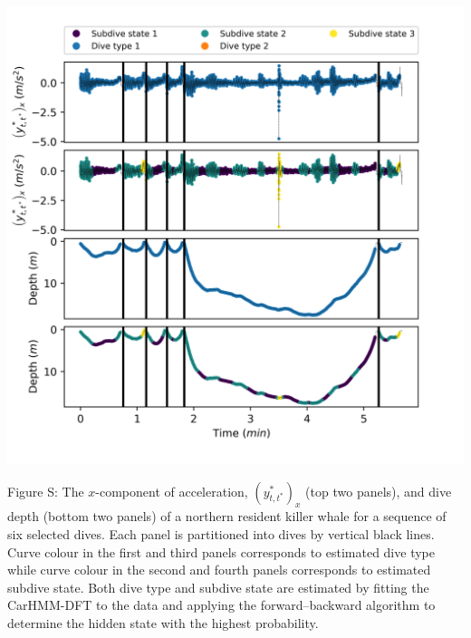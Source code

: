 \documentclass{article}
\begin{document}
        \begin{center}
        \includegraphics[width=6in]{../Plots/2019/20190902-182840-CATs_OB_1_0_267_CarHMM_decoded_dives.png}
        \end{center}
        
        \noindent Figure S: The $x$-component of acceleration, $(y^*_{t,t^*})_x$ (top two panels), and dive depth (bottom two panels) of a northern resident killer whale for a sequence of six selected dives. Each panel is partitioned into dives by vertical black lines. Curve colour in the first and third panels corresponds to estimated dive type while curve colour in the second and fourth panels corresponds to estimated subdive state. Both dive type and subdive state are estimated by fitting the CarHMM-DFT to the data and applying the forward--backward algorithm to determine the hidden state with the highest probability.
        \addtocounter{fignum}{1}
        
\end{document}
